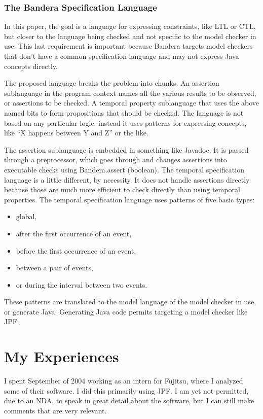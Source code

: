\documentclass{article}
\begin{document}
\begin{multicols}{2}
\subsubsection{The Bandera Specification Language~\cite{corbett00language}}

In this paper, the goal is a language for expressing constraints, like
LTL or CTL, but closer to the language being checked and not specific
to the model checker in use.  This last requirement is important
because Bandera targets model checkers that don't have a common
specification language and may not express Java concepts directly.

The proposed language breaks the problem into chunks.  An assertion
sublanguage in the program context names all the various results to be
observed, or assertions to be checked.  A temporal property
sublanguage that uses the above named bits to form propositions that
should be checked.  The language is not based on any particular logic:
instead it uses patterns for expressing concepts, like ``X happens
between Y and Z'' or the like.

The assertion sublanguage is embedded in something like Javadoc.  It
is passed through a preprocessor, which goes through and changes
assertions into executable checks using Bandera.assert (boolean).  The
temporal specification language is a little different, by necessity.
It does not handle assertions directly because those are much more
efficient to check directly than using temporal properties.  The
temporal specification language uses patterns of five basic types:
\begin{itemize}
\item global,
\item after the first occurrence of an event,
\item before the first occurrence of an event,
\item between a pair of events,
\item or during the interval between two events.
\end{itemize}
These patterns are translated to the model language of the model
checker in use, or generate Java.  Generating Java code permits
targeting a model checker like JPF.

\section{My Experiences}

I spent September of 2004 working as an intern for Fujitsu, where I
analyzed some of their software.  I did this primarily using JPF.  I
am yet not permitted, due to an NDA, to speak in great detail about
the software, but I can still make comments that are very relevant.


\end{multicols}
\end{document}
